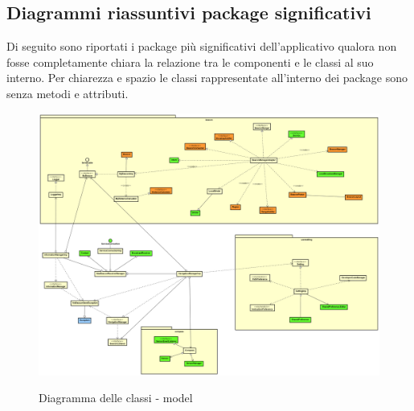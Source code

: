 \documentclass[../DefinizioneDiProdotto.tex]{subfiles}
\begin{document}
\begin{appendices}

\section{Diagrammi riassuntivi package significativi}
	Di seguito sono riportati i package più significativi dell'applicativo qualora non fosse completamente chiara la relazione tra le componenti e le classi al suo interno. Per chiarezza e spazio le classi rappresentate all'interno dei package sono senza metodi e attributi.

		\begin{figure}
			\includegraphics[angle=90,width=\textwidth, height=\textheight, keepaspectratio]{diagrams/ModelCompleteNoMethods/PNGpackage/model}
			\label{modelPackage}
			\caption{Diagramma delle classi - model}
		\end{figure}
	

\end{appendices}
\end{document}
